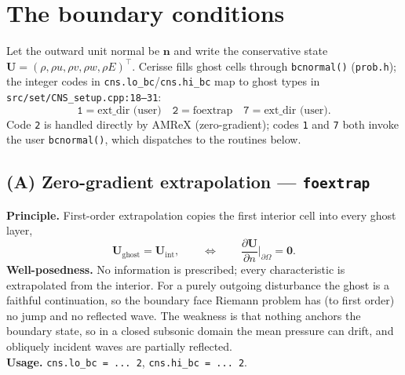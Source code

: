 \documentclass[11pt]{article}
\newcommand{\Uvec}{\mathbf{U}}
\begin{document}
\section{The boundary conditions}
Let the outward unit normal be $\bm{n}$ and write the conservative state
$\Uvec=(\rho,\rho u,\rho v,\rho w,\rho E)^\top$. Cerisse fills ghost cells
through \texttt{bcnormal()} (\texttt{prob.h}); the integer codes in
\texttt{cns.lo\_bc}/\texttt{cns.hi\_bc} map to ghost types in
\texttt{src/set/CNS\_setup.cpp:18--31}:
\[
\texttt{1}=\text{ext\_dir (user)}\quad
\texttt{2}=\text{foextrap}\quad
\texttt{7}=\text{ext\_dir (user)}.
\]
Code \texttt{2} is handled directly by AMReX (zero-gradient); codes \texttt{1}
and \texttt{7} both invoke the user \texttt{bcnormal()}, which dispatches to the
routines below.

\subsection{(A) Zero-gradient extrapolation --- \texttt{foextrap}}
\textbf{Principle.} First-order extrapolation copies the first interior cell into
every ghost layer,
\begin{equation}
\Uvec_{\text{ghost}} = \Uvec_{\text{int}},
\qquad\Longleftrightarrow\qquad
\frac{\partial \Uvec}{\partial n}\bigg|_{\partial\Omega}=\bm 0 .
\end{equation}
\textbf{Well-posedness.} No information is prescribed; every characteristic is
extrapolated from the interior. For a purely outgoing disturbance the ghost is a
faithful continuation, so the boundary face Riemann problem has (to first order)
no jump and no reflected wave. The weakness is that nothing anchors the boundary
state, so in a closed subsonic domain the mean pressure can drift, and obliquely
incident waves are partially reflected.\\
\textbf{Usage.} \lstinline|cns.lo_bc = ... 2|, \lstinline|cns.hi_bc = ... 2|.
\end{document}
